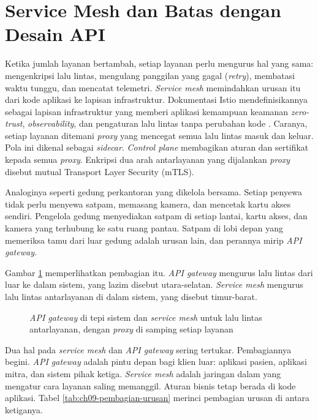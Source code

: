 \section{Service Mesh dan Batas dengan Desain API}
\label{sec:ch09-mesh}

Ketika jumlah layanan bertambah, setiap layanan perlu mengurus hal yang sama: mengenkripsi
lalu lintas, mengulang panggilan yang gagal (\textit{retry}), membatasi waktu tunggu, dan mencatat
telemetri. \textit{Service mesh} memindahkan urusan itu dari kode aplikasi ke lapisan infrastruktur.
Dokumentasi Istio mendefinisikannya sebagai lapisan infrastruktur yang memberi aplikasi kemampuan
keamanan \textit{zero-trust}, \textit{observability}, dan pengaturan lalu lintas tanpa perubahan
kode \cite{c09-istio-mesh}. Caranya, setiap layanan ditemani \textit{proxy} yang mencegat semua
lalu lintas masuk dan keluar. Pola ini dikenal sebagai \textit{sidecar}. \textit{Control plane}
membagikan aturan dan sertifikat kepada semua \textit{proxy}. Enkripsi dua arah antarlayanan yang
dijalankan \textit{proxy} disebut mutual Transport Layer Security (mTLS).

Analoginya seperti gedung perkantoran yang dikelola bersama. Setiap penyewa tidak perlu menyewa
satpam, memasang kamera, dan mencetak kartu akses sendiri. Pengelola gedung menyediakan satpam di
setiap lantai, kartu akses, dan kamera yang terhubung ke satu ruang pantau. Satpam di lobi depan
yang memeriksa tamu dari luar gedung adalah urusan lain, dan perannya mirip \textit{API gateway}.

Gambar \ref{fig:ch09-service-mesh} memperlihatkan pembagian itu. \textit{API gateway} mengurus lalu
lintas dari luar ke dalam sistem, yang lazim disebut utara-selatan. \textit{Service mesh} mengurus
lalu lintas antarlayanan di dalam sistem, yang disebut timur-barat.

\begin{figure}[!htb]
  \centering
  
  \caption{\textit{API gateway} di tepi sistem dan \textit{service mesh} untuk lalu lintas
           antarlayanan, dengan \textit{proxy} di samping setiap layanan}
  \label{fig:ch09-service-mesh}
\end{figure}

Dua hal pada \textit{service mesh} dan \textit{API gateway} sering tertukar. Pembagiannya begini.
\textit{API gateway} adalah pintu depan bagi klien luar: aplikasi pasien, aplikasi mitra, dan
sistem pihak ketiga. \textit{Service mesh} adalah jaringan dalam yang mengatur cara layanan saling
memanggil. Aturan bisnis tetap berada di kode aplikasi. Tabel \ref{tab:ch09-pembagian-urusan}
merinci pembagian urusan di antara ketiganya.

